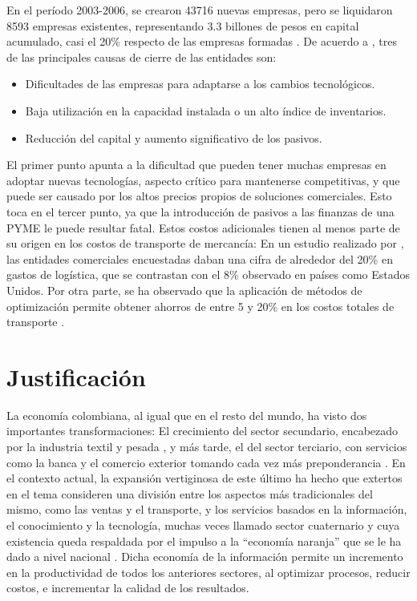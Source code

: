 \message{ !name(proposal.tex)}\documentclass[12pt]{extarticle}
\begin{document}
En el período 2003-2006, se crearon 43716 nuevas empresas, pero se liquidaron
8593 empresas existentes, representando 3.3 billones de pesos en capital
acumulado, casi el 20\% respecto de las empresas formadas
\cite{espinosa_fracaso_2015}\cite[págs. 14-21]{bogota_dinamica_2006}. De acuerdo
a \cite[págs. 13-14]{vega_pymes_2011}\cite[págs. 23-24]{bogota_dinamica_2006}, tres de las principales
causas de cierre de las entidades son:
\begin{itemize}
\item Dificultades de las empresas para adaptarse a los cambios tecnológicos.
\item Baja utilización en la capacidad instalada o un alto índice de
  inventarios.
\item Reducción del capital y aumento significativo de los pasivos.
\end{itemize}
El primer punto apunta a la dificultad que pueden tener muchas empresas en
adoptar nuevas tecnologías, aspecto crítico para mantenerse competitivas, y que
puede ser causado por los altos precios propios de soluciones comerciales. Esto
toca en el tercer punto, ya que la introducción de pasivos a las finanzas de una
PYME le puede resultar fatal. Estos costos adicionales tienen al menos parte de
su origen en los costos de transporte de mercancía: En un estudio realizado por
\cite[pág. 6]{gaytan_logistica_2017}, las entidades comerciales encuestadas
daban una cifra de alrededor del 20\% en gastos de logística, que se contrastan
con el 8\% observado en países como Estados Unidos. Por otra parte, se ha
observado que la aplicación de métodos de optimización permite obtener ahorros
de entre 5 y 20\% en los costos totales de transporte
\cite{toth_paolo_vehicle_2002}.


\section{Justificación}
La economía colombiana, al igual que en el resto del mundo, ha visto dos
importantes transformaciones: El crecimiento del sector secundario, encabezado
por la industria textil y pesada \cite{naranjo_industria_nodate}, y más tarde,
el del sector terciario, con servicios como la banca y el comercio exterior
tomando cada vez más preponderancia \cite{urrutia_perspectivas_1990} . En el
contexto actual, la expansión vertiginosa de este último ha hecho que extertos
en el tema consideren una división entre los aspectos más tradicionales del
mismo, como las ventas y el transporte, y los servicios basados en la
información, el conocimiento y la tecnología, muchas veces llamado sector
cuaternario y cuya existencia queda respaldada por el impulso a la ``economía
naranja'' que se le ha dado a nivel nacional
\cite{noauthor_econominaranja_nodate}. Dicha economía de la información permite
un incremento en la productividad de todos los anteriores sectores, al optimizar
procesos, reducir costos, e incrementar la calidad de los resultados.
\end{document}
